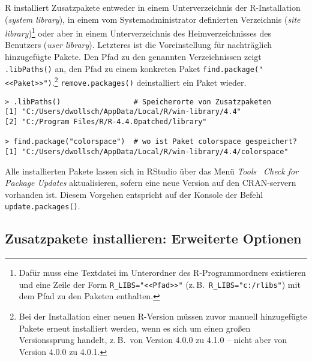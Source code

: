 R installiert Zusatzpakete entweder in einem Unterverzeichnis der R-Installation (\emph{system library}), in einem vom Systemadministrator definierten Verzeichnis (\emph{site library})\footnote{Dafür muss eine Textdatei  im Unterordner  des R-Programmordners existieren und eine Zeile der Form \lstinline!R_LIBS="<<Pfad>>"! (z.\,B.\ \lstinline!R_LIBS="c:/rlibs"!) mit dem Pfad zu den Paketen enthalten.} oder aber in einem Unterverzeichnis des Heimverzeichnisses des Benutzers (\emph{user library}). Letzteres ist die Voreinstellung für nachträglich hinzugefügte Pakete. Den Pfad zu den genannten Verzeichnissen zeigt \lstinline!.libPaths()! an, den Pfad zu einem konkreten Paket \lstinline!find.package("<<Paket>>")!.\footnote{Bei der Installation einer neuen R-Version müssen zuvor manuell hinzugefügte Pakete erneut installiert werden, wenn es sich um einen großen Versionssprung handelt, z.\,B.\ von Version 4.0.0 zu 4.1.0 -- nicht aber von Version 4.0.0 zu 4.0.1.} \lstinline!remove.packages()! deinstalliert ein Paket wieder.
\begin{lstlisting}
> .libPaths()                 # Speicherorte von Zusatzpaketen
[1] "C:/Users/dwollsch/AppData/Local/R/win-library/4.4"
[2] "C:/Program Files/R/R-4.4.0patched/library"

> find.package("colorspace")  # wo ist Paket colorspace gespeichert?
[1] "C:/Users/dwollsch/AppData/Local/R/win-library/4.4/colorspace"
\end{lstlisting}

Alle installierten Pakete lassen sich in RStudio über das Menü \emph{Tools} \textrightarrow\ \emph{Check for Package Updates} aktualisieren, sofern eine neue Version auf den CRAN-servern vorhanden ist. Diesem Vorgehen entspricht auf der Konsole der Befehl \lstinline!update.packages()!.

\subsection{Zusatzpakete installieren: Erweiterte Optionen}

